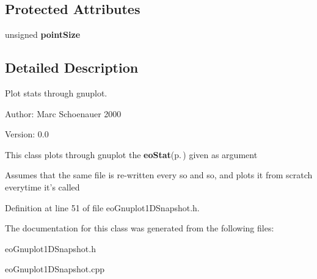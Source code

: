 \subsection*{Protected Attributes}
\begin{CompactItemize}
\item 
unsigned {\bf point\-Size}\label{classeo_gnuplot1_d_snapshot_p0}

\end{CompactItemize}


\subsection{Detailed Description}
Plot stats through gnuplot. 

\begin{Desc}
\item[Author:]Marc Schoenauer 2000 \end{Desc}
\begin{Desc}
\item[Version:]0.0\end{Desc}
This class plots through gnuplot the {\bf eo\-Stat}{\rm (p.\,\pageref{classeo_stat})} given as argument

Assumes that the same file is re-written every so and so, and plots it from scratch everytime it's called 



Definition at line 51 of file eo\-Gnuplot1DSnapshot.h.

The documentation for this class was generated from the following files:\begin{CompactItemize}
\item 
eo\-Gnuplot1DSnapshot.h\item 
eo\-Gnuplot1DSnapshot.cpp\end{CompactItemize}
